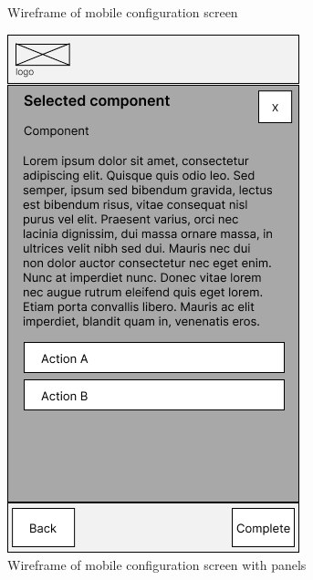 \begin{figure}[h]
\begin{minipage}{0.4\textwidth}
        \caption{Wireframe of mobile configuration screen}
        \label{fig:wireframe-configuration-mobile}
    \end{minipage}\hfill
    \begin{minipage}{0.4\textwidth}
        \centering
        \includegraphics[width=\linewidth]{images/wireframe_configuration_mobile_panels.png}
        \caption{Wireframe of mobile configuration screen with panels}
        \label{fig:wireframe-configuration-panel-mobile}
    \end{minipage}
\end{figure}

